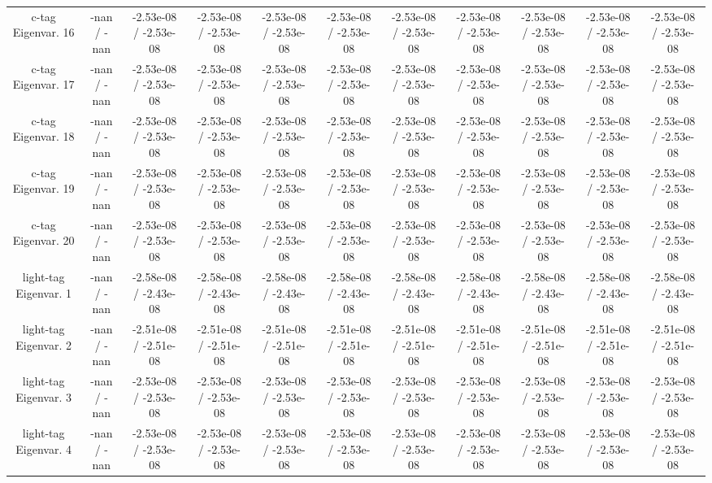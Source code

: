 \begin{table}[htbp]
\begin{center}
\begin{tabular}{|c|c|c|c|c|c|c|c|c|c|c|}
  c-tag Eigenvar. 16 & -nan / -nan & -2.53e-08 / -2.53e-08 & -2.53e-08 / -2.53e-08 & -2.53e-08 / -2.53e-08 & -2.53e-08 / -2.53e-08 & -2.53e-08 / -2.53e-08 & -2.53e-08 / -2.53e-08 & -2.53e-08 / -2.53e-08 & -2.53e-08 / -2.53e-08 & -2.53e-08 / -2.53e-08 \\ 
  c-tag Eigenvar. 17 & -nan / -nan & -2.53e-08 / -2.53e-08 & -2.53e-08 / -2.53e-08 & -2.53e-08 / -2.53e-08 & -2.53e-08 / -2.53e-08 & -2.53e-08 / -2.53e-08 & -2.53e-08 / -2.53e-08 & -2.53e-08 / -2.53e-08 & -2.53e-08 / -2.53e-08 & -2.53e-08 / -2.53e-08 \\ 
  c-tag Eigenvar. 18 & -nan / -nan & -2.53e-08 / -2.53e-08 & -2.53e-08 / -2.53e-08 & -2.53e-08 / -2.53e-08 & -2.53e-08 / -2.53e-08 & -2.53e-08 / -2.53e-08 & -2.53e-08 / -2.53e-08 & -2.53e-08 / -2.53e-08 & -2.53e-08 / -2.53e-08 & -2.53e-08 / -2.53e-08 \\ 
  c-tag Eigenvar. 19 & -nan / -nan & -2.53e-08 / -2.53e-08 & -2.53e-08 / -2.53e-08 & -2.53e-08 / -2.53e-08 & -2.53e-08 / -2.53e-08 & -2.53e-08 / -2.53e-08 & -2.53e-08 / -2.53e-08 & -2.53e-08 / -2.53e-08 & -2.53e-08 / -2.53e-08 & -2.53e-08 / -2.53e-08 \\ 
  c-tag Eigenvar. 20 & -nan / -nan & -2.53e-08 / -2.53e-08 & -2.53e-08 / -2.53e-08 & -2.53e-08 / -2.53e-08 & -2.53e-08 / -2.53e-08 & -2.53e-08 / -2.53e-08 & -2.53e-08 / -2.53e-08 & -2.53e-08 / -2.53e-08 & -2.53e-08 / -2.53e-08 & -2.53e-08 / -2.53e-08 \\ 
  light-tag Eigenvar. 1 & -nan / -nan & -2.58e-08 / -2.43e-08 & -2.58e-08 / -2.43e-08 & -2.58e-08 / -2.43e-08 & -2.58e-08 / -2.43e-08 & -2.58e-08 / -2.43e-08 & -2.58e-08 / -2.43e-08 & -2.58e-08 / -2.43e-08 & -2.58e-08 / -2.43e-08 & -2.58e-08 / -2.43e-08 \\ 
  light-tag Eigenvar. 2 & -nan / -nan & -2.51e-08 / -2.51e-08 & -2.51e-08 / -2.51e-08 & -2.51e-08 / -2.51e-08 & -2.51e-08 / -2.51e-08 & -2.51e-08 / -2.51e-08 & -2.51e-08 / -2.51e-08 & -2.51e-08 / -2.51e-08 & -2.51e-08 / -2.51e-08 & -2.51e-08 / -2.51e-08 \\ 
  light-tag Eigenvar. 3 & -nan / -nan & -2.53e-08 / -2.53e-08 & -2.53e-08 / -2.53e-08 & -2.53e-08 / -2.53e-08 & -2.53e-08 / -2.53e-08 & -2.53e-08 / -2.53e-08 & -2.53e-08 / -2.53e-08 & -2.53e-08 / -2.53e-08 & -2.53e-08 / -2.53e-08 & -2.53e-08 / -2.53e-08 \\ 
  light-tag Eigenvar. 4 & -nan / -nan & -2.53e-08 / -2.53e-08 & -2.53e-08 / -2.53e-08 & -2.53e-08 / -2.53e-08 & -2.53e-08 / -2.53e-08 & -2.53e-08 / -2.53e-08 & -2.53e-08 / -2.53e-08 & -2.53e-08 / -2.53e-08 & -2.53e-08 / -2.53e-08 & -2.53e-08 / -2.53e-08 \\ 

\end{tabular}
\end{center}
\end{table}
